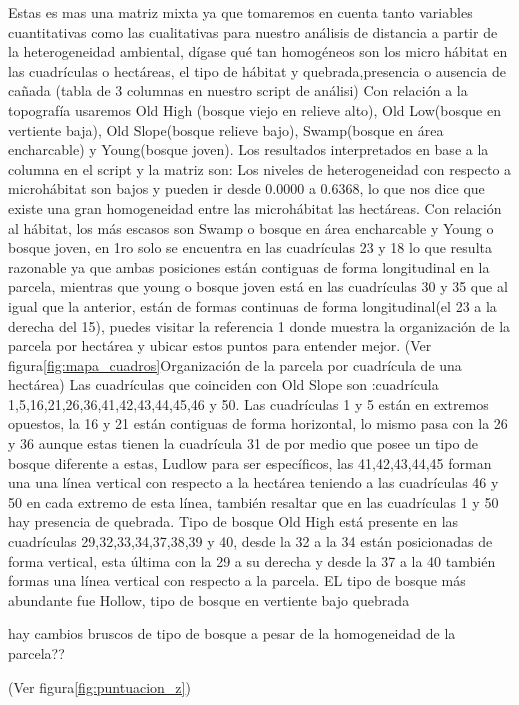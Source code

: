 \documentclass[11pt,]{article}
\begin{document}
Estas es mas una matriz mixta ya que tomaremos en cuenta tanto variables
cuantitativas como las cualitativas para nuestro análisis de distancia a
partir de la heterogeneidad ambiental, dígase qué tan homogéneos son los
micro hábitat en las cuadrículas o hectáreas, el tipo de hábitat y
quebrada,presencia o ausencia de cañada (tabla de 3 columnas en nuestro
script de análisi) Con relación a la topografía usaremos Old High
(bosque viejo en relieve alto), Old Low(bosque en vertiente baja), Old
Slope(bosque relieve bajo), Swamp(bosque en área encharcable) y
Young(bosque joven). Los resultados interpretados en base a la columna
en el script y la matriz son: Los niveles de heterogeneidad con respecto
a microhábitat son bajos y pueden ir desde 0.0000 a 0.6368, lo que nos
dice que existe una gran homogeneidad entre las microhábitat las
hectáreas. Con relación al hábitat, los más escasos son Swamp o bosque
en área encharcable y Young o bosque joven, en 1ro solo se encuentra en
las cuadrículas 23 y 18 lo que resulta razonable ya que ambas posiciones
están contiguas de forma longitudinal en la parcela, mientras que young
o bosque joven está en las cuadrículas 30 y 35 que al igual que la
anterior, están de formas continuas de forma longitudinal(el 23 a la
derecha del 15), puedes visitar la referencia 1 donde muestra la
organización de la parcela por hectárea y ubicar estos puntos para
entender mejor. (Ver figura\ref{fig:mapa_cuadros}Organización de la
parcela por cuadrícula de una hectárea) Las cuadrículas que coinciden
con Old Slope son :cuadrícula 1,5,16,21,26,36,41,42,43,44,45,46 y 50.
Las cuadrículas 1 y 5 están en extremos opuestos, la 16 y 21 están
contiguas de forma horizontal, lo mismo pasa con la 26 y 36 aunque estas
tienen la cuadrícula 31 de por medio que posee un tipo de bosque
diferente a estas, Ludlow para ser específicos, las 41,42,43,44,45
forman una una línea vertical con respecto a la hectárea teniendo a las
cuadrículas 46 y 50 en cada extremo de esta línea, también resaltar que
en las cuadrículas 1 y 50 hay presencia de quebrada. Tipo de bosque Old
High está presente en las cuadrículas 29,32,33,34,37,38,39 y 40, desde
la 32 a la 34 están posicionadas de forma vertical, esta última con la
29 a su derecha y desde la 37 a la 40 también formas una línea vertical
con respecto a la parcela. EL tipo de bosque más abundante fue Hollow,
tipo de bosque en vertiente bajo quebrada

hay cambios bruscos de tipo de bosque a pesar de la homogeneidad de la
parcela??

(Ver figura\ref{fig:puntuacion_z})
\end{document}
